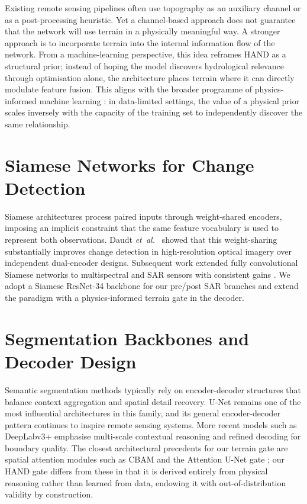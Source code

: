 \documentclass[12pt,oneside]{report}
\newcommand{\etal}{\textit{et~al.}}
\begin{document}
Existing remote sensing pipelines often use topography as an auxiliary channel
or as a post-processing heuristic.
Yet a channel-based approach does not guarantee that the network will use terrain
in a physically meaningful way.
A stronger approach is to incorporate terrain into the internal information flow
of the network.
From a machine-learning perspective, this idea reframes HAND as a structural
prior; instead of hoping the model discovers hydrological relevance through
optimisation alone, the architecture places terrain where it can directly
modulate feature fusion.
This aligns with the broader programme of physics-informed machine learning
\cite{karniadakis2021physics}: in data-limited settings, the value of a physical
prior scales inversely with the capacity of the training set to independently
discover the same relationship.

\section{Siamese Networks for Change Detection}

Siamese architectures \cite{bromley1993signature} process paired inputs through
weight-shared encoders, imposing an implicit constraint that the same feature
vocabulary is used to represent both observations.
Daudt \etal~\cite{daudt2018fully} showed that this weight-sharing substantially
improves change detection in high-resolution optical imagery over independent
dual-encoder designs.
Subsequent work extended fully convolutional Siamese networks to multispectral
and SAR sensors with consistent gains \cite{chen2020spatial}.
We adopt a Siamese ResNet-34 \cite{he2016deep} backbone for our pre/post SAR
branches and extend the paradigm with a physics-informed terrain gate in the
decoder.

\section{Segmentation Backbones and Decoder Design}

Semantic segmentation methods typically rely on encoder-decoder structures that
balance context aggregation and spatial detail recovery.
U-Net \cite{ronneberger2015unet} remains one of the most influential
architectures in this family, and its general encoder-decoder pattern continues
to inspire remote sensing systems.
More recent models such as DeepLabv3+ \cite{chen2018deeplab} emphasise
multi-scale contextual reasoning and refined decoding for boundary quality.
The closest architectural precedents for our terrain gate are spatial attention
modules such as CBAM \cite{woo2018cbam} and the Attention U-Net gate
\cite{oktay2018attention}; our HAND gate differs from these in that it is
derived entirely from physical reasoning rather than learned from data,
endowing it with out-of-distribution validity by construction.
\end{document}
